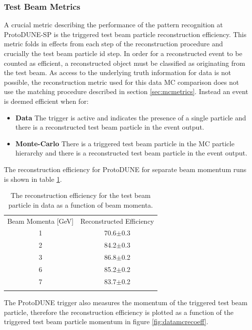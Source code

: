 \subsubsection{Test Beam Metrics}

A crucial metric describing the performance of the pattern recognition at ProtoDUNE-SP is the triggered test beam particle reconstruction efficiency.  This metric folds in effects from each step of the reconstruction procedure and crucially the test beam particle id step.  In order for a reconstructed event to be counted as efficient, a reconstructed object must be classified as originating from the test beam.  As access to the underlying truth information for data is not possible, the reconstruction metric used for this data MC comparison does not use the matching procedure described in section \ref{sec:mcmetrics}.  Instead an event is deemed efficient when for:

\begin{itemize}
    \item \textbf{Data} The trigger is active and indicates the presence of a single particle and there is a reconstructed test beam particle in the event output.
    \item \textbf{Monte-Carlo} There is a triggered test beam particle in the MC particle hierarchy and there is a reconstructed test beam particle in the event output.
\end{itemize}

The reconstruction efficiency for ProtoDUNE for separate beam momentum runs is shown in table \ref{tab:dataeff}.  

\begin{table}
\centering
\caption{The reconstruction efficiency for the test beam particle in data as a function of beam momenta.}
\label{tab:dataeff} 
\begin{tabular}{cc}
\hline\noalign{\smallskip}
Beam Momenta [GeV] & Reconstructed Efficiency  \\
\noalign{\smallskip}\hline\noalign{\smallskip}
1 & 70.6$\pm$0.3 \\
2 & 84.2$\pm$0.3 \\
3 & 86.8$\pm$0.2 \\
6 & 85.2$\pm$0.2 \\
7 & 83.7$\pm$0.2 \\
\noalign{\smallskip}\hline
\end{tabular}
\end{table}

The ProtoDUNE trigger also measures the momentum of the triggered test beam particle, therefore the reconstruction efficiency is plotted as a function of the triggered test beam particle momentum in figure \ref{fig:datamcrecoeff}.  

